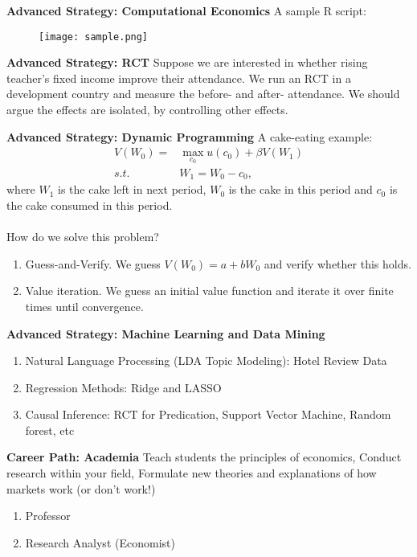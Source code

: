 \documentclass{beamer}
\let\olditem=\item%
\renewcommand{\item}{\olditem \justifying}%
\begin{document}
\begin{frame}{\bf Advanced Strategy: Computational Economics}
A sample R script:
\begin{figure}[H]
	\centering
\texttt{[image: sample.png]}
\end{figure}
\end{frame}

\begin{frame}{\bf Advanced Strategy: RCT}
Suppose we are interested in whether rising teacher's fixed income improve their attendance. We run an RCT in a development country and measure the before- and after- attendance. We should argue the effects are isolated, by controlling other effects.
\end{frame}

\begin{frame}{\bf Advanced Strategy: Dynamic Programming}
A cake-eating example: 
\begin{align*}
V(W_0)=&\max_{c_0}u(c_0)+\beta V(W_1)\\
s.t. &W_1=W_0-c_0,
\end{align*}
where $W_1$ is the cake left in next period, $W_0$ is the cake in this period and $c_0$ is the cake consumed in this period. 
~\\
~\\
How do we solve this problem?
\begin{enumerate}
	\item Guess-and-Verify. We guess $V(W_0)=a+bW_0$ and verify whether this holds.
	\item Value iteration. We guess an initial value function and iterate it over finite times until convergence.
\end{enumerate}
\end{frame}

\begin{frame}{\bf Advanced Strategy: Machine Learning and Data Mining}
\begin{enumerate}
	\item Natural Language Processing (LDA Topic Modeling): Hotel Review Data
	\item Regression Methods: Ridge and LASSO 
	\item Causal Inference: RCT for Predication, Support Vector Machine, Random forest, etc
\end{enumerate}
\end{frame}

\begin{frame}{\bf Career Path: Academia}
Teach students the principles of economics, Conduct research within your field, Formulate new theories and explanations of how markets work (or don’t work!)
\begin{enumerate}
\item Professor
\item Research Analyst (Economist)
\end{enumerate}
\end{frame}
\end{document}
